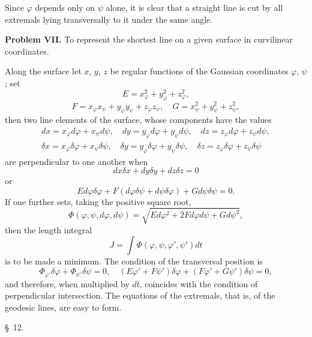 \documentclass[11pt,a4paper,leqno]{article}
\begin{document}
Since $\varphi$ depends only on $\psi$ alone, it is clear that a straight line is cut by all extremals lying transversally to it under the same angle.

\medskip
\noindent\textbf{Problem VII.} To represent the shortest line on a given surface in curvilinear coordinates.

Along the surface let $x$, $y$, $z$ be regular functions of the Gaussian coordinates $\varphi$, $\psi$; set
\[
E=x_\varphi^2+y_\varphi^2+z_\varphi^2,
\]
\[
F=x_\varphi x_\psi+y_\varphi y_\psi+z_\varphi z_\psi,\quad
G=x_\psi^2+y_\psi^2+z_\psi^2,
\]
then two line elements of the surface, whose components have the values
\[
\begin{gathered}
dx=x_\varphi d\varphi+x_\psi d\psi,\quad dy=y_\varphi d\varphi+y_\psi d\psi,\quad dz=z_\varphi d\varphi+z_\psi d\psi,\\
\delta x=x_\varphi \delta\varphi+x_\psi \delta\psi,\quad \delta y=y_\varphi \delta\varphi+y_\psi \delta\psi,\quad \delta z=z_\varphi \delta\varphi+z_\psi \delta\psi
\end{gathered}
\]
are perpendicular to one another when
\[
dx\delta x+dy\delta y+dz\delta z=0
\]
or
\[
Ed\varphi\delta\varphi+F(d\varphi\delta\psi+d\psi\delta\varphi)+Gd\psi\delta\psi=0.
\]
If one further sets, taking the positive square root,
\[
\Phi(\varphi,\psi,d\varphi,d\psi)=\sqrt{Ed\varphi^2+2Fd\varphi d\psi+Gd\psi^2},
\]
then the length integral
\[
J=\int \Phi(\varphi,\psi,\varphi',\psi')dt
\]
is to be made a minimum. The condition of the transversal position is
\[
\Phi_{\varphi'}\delta\varphi+\Phi_{\psi'}\delta\psi=0,\quad
(E\varphi'+F\psi')\delta\varphi+(F\varphi'+G\psi')\delta\psi=0,
\]
and therefore, when multiplied by $dt$, coincides with the condition of perpendicular intersection. The equations of the extremals, that is, of the geodesic lines, are easy to form.

\begin{center}{\large \S~12.}\end{center}
\end{document}
